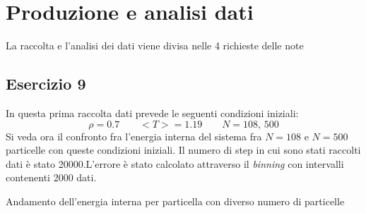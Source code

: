 \section{Produzione e analisi dati}
La raccolta e l'analisi dei dati viene divisa nelle 4 richieste delle note
\subsection{Esercizio 9}
In questa prima raccolta dati prevede le seguenti condizioni iniziali:
$$
	\rho = 0.7 \qquad <T>=1.19 \qquad N=108,\,500
$$
Si veda ora il confronto fra l'energia interna del sistema fra $N=108$ e $N=500$ particelle con queste condizioni iniziali.
Il numero di step in cui sono stati raccolti dati è stato 20000.L'errore è stato calcolato attraverso il \emph{binning} con intervalli contenenti 2000 dati.
\begin{myfig}[h]
	\caption{Andamento dell'energia interna per particella con diverso numero di particelle}
\end{myfig}

